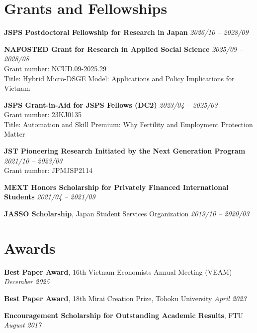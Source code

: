 \documentclass[12pt]{article}
\begin{document}

\section{Grants and Fellowships}

\textbf{JSPS Postdoctoral Fellowship for Research in Japan} \hfill \emph{2026/10 -- 2028/09}

\textbf{NAFOSTED Grant for Research in Applied Social Science} \hfill \emph{2025/09 -- 2028/08} \\
Grant number: NCUD.09-2025.29 \\
Title: Hybrid Micro-DSGE Model: Applications and Policy Implications for Vietnam

\textbf{JSPS Grant-in-Aid for JSPS Fellows (DC2)} \hfill \emph{2023/04 -- 2025/03} \\
Grant number: 23KJ0135 \\
Title: Automation and Skill Premium: Why Fertility and Employment Protection Matter

\textbf{JST Pioneering Research Initiated by the Next Generation Program} \hfill \emph{2021/10 -- 2023/03} \\
Grant number: JPMJSP2114

\textbf{MEXT Honors Scholarship for Privately Financed International Students} \hfill \emph{2021/04 -- 2021/09}

\textbf{JASSO Scholarship}, Japan Student Services Organization \hfill \emph{2019/10 -- 2020/03}


\section{Awards}

\textbf{Best Paper Award}, 16th Vietnam Economists Annual Meeting (VEAM) \hfill \emph{December 2025}

\textbf{Best Paper Award}, 18th Mirai Creation Prize, Tohoku University \hfill \emph{April 2023}

\textbf{Encouragement Scholarship for Outstanding Academic Results}, FTU \hfill \emph{August 2017}

\end{document}
